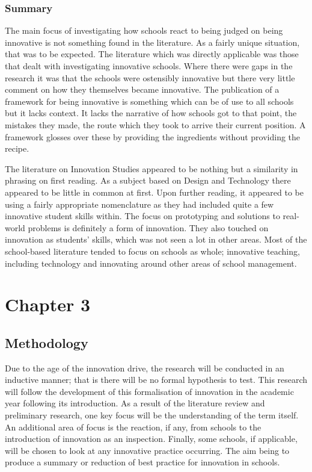 \documentclass[11pt]{article}
\begin{document}
\subsubsection{Summary}
The main focus of investigating how schools react to being judged on being innovative is not something found in the literature. As a fairly unique situation, that was to be expected. The literature which was directly applicable was those that dealt with investigating innovative schools. Where there were gaps in the research it was that the schools were ostensibly innovative but there very little comment on how they themselves became innovative. The publication of a framework for being innovative is something which can be of use to all schools but it lacks context. It lacks the narrative of how schools got to that point, the mistakes they made, the route which they took to arrive their current position. A framework glosses over these by providing the ingredients without providing the recipe.

The literature on Innovation Studies appeared to be nothing but a similarity in phrasing on first reading. As a subject based on Design and Technology there appeared to be little in common at first. Upon further reading, it appeared to be using a fairly appropriate nomenclature as they had included quite a few innovative student skills within. The focus on prototyping and solutions to real-world problems is definitely a form of innovation. They also touched on innovation as students' skills, which was not seen a lot in other areas. Most of the school-based literature tended to focus on schools as whole; innovative teaching, including technology and innovating around other areas of school management. 

\section{Chapter 3}
\subsection{Methodology}

Due to the age of the innovation drive, the research will be conducted in an inductive manner; that is there will be no formal hypothesis to test. This research will follow the development of this formalisation of innovation in the academic year following its introduction. As a result of the literature review and preliminary research, one key focus will be the understanding of the term itself. An additional area of focus is the reaction, if any, from schools to the introduction of innovation as an inspection. Finally, some schools, if applicable, will be chosen to look at any innovative practice occurring. The aim being to produce a summary or reduction of best practice for innovation in schools.
\end{document}
